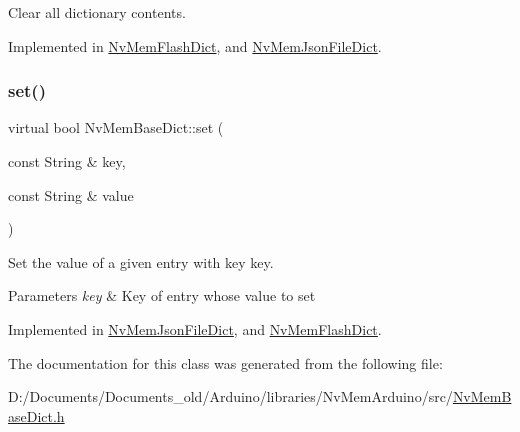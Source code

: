 Clear all dictionary contents. 



Implemented in \mbox{\hyperlink{class_nv_mem_flash_dict_a77ef71d649eb918d527f17e2d10aa622}{Nv\+Mem\+Flash\+Dict}}, and \mbox{\hyperlink{class_nv_mem_json_file_dict_aa66c932e83655464e279861f1685e2ff}{Nv\+Mem\+Json\+File\+Dict}}.

\mbox{\label{class_nv_mem_base_dict_aac0c8ea17230b315ff906bce84e94124}} 
\subsubsection{\texorpdfstring{set()}{set()}}
{\footnotesize\ttfamily virtual bool Nv\+Mem\+Base\+Dict\+::set (\begin{DoxyParamCaption}\item[{const String \&}]{key,  }\item[{const String \&}]{value }\end{DoxyParamCaption})\hspace{0.3cm}{\ttfamily [pure virtual]}}



Set the value of a given entry with key {\ttfamily key}. 


\begin{DoxyParams}{Parameters}
{\em key} & Key of entry whose value to set \\
\hline
\end{DoxyParams}


Implemented in \mbox{\hyperlink{class_nv_mem_json_file_dict_aec669b13cce54561e2f26074dea4d10d}{Nv\+Mem\+Json\+File\+Dict}}, and \mbox{\hyperlink{class_nv_mem_flash_dict_ad88e325c0a9cebef246815c6bcdc9cef}{Nv\+Mem\+Flash\+Dict}}.



The documentation for this class was generated from the following file\+:\begin{DoxyCompactItemize}
\item 
D\+:/\+Documents/\+Documents\+\_\+old/\+Arduino/libraries/\+Nv\+Mem\+Arduino/src/\mbox{\hyperlink{_nv_mem_base_dict_8h}{Nv\+Mem\+Base\+Dict.\+h}}\end{DoxyCompactItemize}
